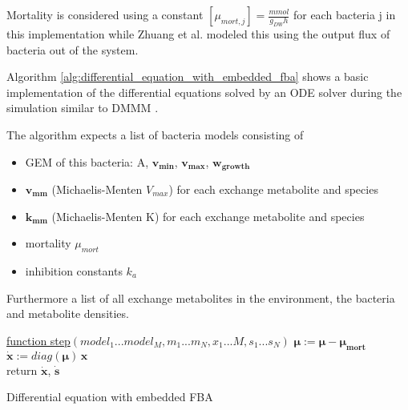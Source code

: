 Mortality is considered using a constant $\left[ \mu_{mort,j} \right] = \frac{mmol}{g_{DW} h}$ for each bacteria j in this implementation while Zhuang et al. modeled this
using the output flux of bacteria out of the system.

Algorithm \ref{alg:differential_equation_with_embedded_fba} shows a basic implementation of the differential equations solved by an ODE
solver during the simulation similar to DMMM \cite{zhuang_genome-scale_2011}.

The algorithm expects a list of bacteria models consisting of
\begin{itemize}
 \item GEM of this bacteria: A, $\bm{v_{min}}$, $\bm{v_{max}}$, $\bm{w_{growth}}$
 \item $\bm{v_{mm}}$ (Michaelis-Menten $V_{max}$) for each exchange metabolite and species
 \item $\bm{k_{mm}}$ (Michaelis-Menten K) for each exchange metabolite and species
 \item mortality $\mu_{mort}$
 \item inhibition constants $k_a$
\end{itemize}

Furthermore a list of all exchange metabolites in the environment, the bacteria and metabolite densities.


\begin{algorithm}

    \underline{function step}$(model_1...model_M, m_1...m_N, x_1...M, s_1...s_N)$\;
    $\bm{\mu} := \bm{\mu} - \bm{\mu_{mort}}$\\
    $\dot{\bm{x}} := diag(\bm{\mu}) \, \bm{x}$\\
    return $\dot{\bm{x}}$, $\dot{\bm{s}}$
    \caption{Differential equation with embedded FBA}
    \label{alg:differential_equation_with_embedded_fba}
\end{algorithm}

